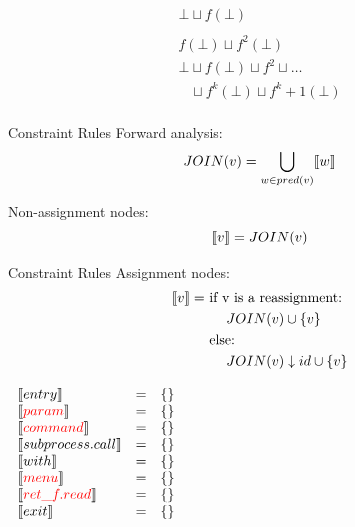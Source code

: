 \begin{frame}
  \[
  \begin{array}{l}
    \bot \sqcup f(\bot)\\
    \phantom{}\\
    f(\bot) \sqcup f^2(\bot)\\
    \phantom{}
    \bot \sqcup f(\bot) \sqcup f^2 \sqcup \dots\\
    \phantom
    \dots \sqcup f^k(\bot) \sqcup f^k+1(\bot)\\
  \end{array}
  \]
\end{frame}

\begin{frame}{Constraint Rules}{}
  {\color{red} Forward} analysis:
  \[ JOIN(v) = \bigcup_{ w \in pred(v)} \llbracket w \rrbracket \]

  Non-assignment nodes:
    \[ \llbracket v \rrbracket = JOIN(v) \]
\end{frame}

\begin{frame}{Constraint Rules}{}
    Assignment nodes:
  \begin{align*}
  \llbracket v \rrbracket = &\text{ if v is a reassignment:}\\
  &\phantom{==}JOIN(v) \cup \{ v \}\\
  &\text{ else:}\\
  &\phantom{==}JOIN(v) \downarrow id \cup \{ v \}\\
  \end{align*}
\end{frame}

\begin{frame}
\[
\begin{array}{lclcl}
  \constraint{entry} & = & \{\} &\phantom{hahahahhh}\\
  \assignconstraint{param} & = & \{\} &\\
  \assignconstraint{command} & = & \{\}&\\
  \constraint{subprocess.call} & = & \{\}&\\
  \constraint{with} & = & \{\}&\\
  \assignconstraint{menu} & = & \{\}&\\
  \assignconstraint{ret\_f.read} & = & \{\}&\\
  \constraint{exit} & = & \{\}&\\
  && \phantom{\{command, param\}} && \phantom{\{command, param\}}
\end{array}
\]
\end{frame}

